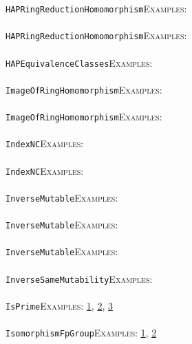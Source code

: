 \documentclass[a4paper,11pt]{report}
\begin{document}
{{ \texttt{HAPRingReductionHomomorphism}{\nobreakspace}{\nobreakspace}{\nobreakspace}{\nobreakspace}\textsc{Examples:} \\
 \\
 \texttt{HAPRingReductionHomomorphism}{\nobreakspace}{\nobreakspace}{\nobreakspace}{\nobreakspace}\textsc{Examples:} \\
 \\
 \texttt{HAP{\textunderscore}EquivalenceClasses}{\nobreakspace}{\nobreakspace}{\nobreakspace}{\nobreakspace}\textsc{Examples:} \\
 \\
 \texttt{ImageOfRingHomomorphism}{\nobreakspace}{\nobreakspace}{\nobreakspace}{\nobreakspace}\textsc{Examples:} \\
 \\
 \texttt{ImageOfRingHomomorphism}{\nobreakspace}{\nobreakspace}{\nobreakspace}{\nobreakspace}\textsc{Examples:} \\
 \\
 \texttt{IndexNC}{\nobreakspace}{\nobreakspace}{\nobreakspace}{\nobreakspace}\textsc{Examples:} \\
 \\
 \texttt{IndexNC}{\nobreakspace}{\nobreakspace}{\nobreakspace}{\nobreakspace}\textsc{Examples:} \\
 \\
 \texttt{InverseMutable}{\nobreakspace}{\nobreakspace}{\nobreakspace}{\nobreakspace}\textsc{Examples:} \\
 \\
 \texttt{InverseMutable}{\nobreakspace}{\nobreakspace}{\nobreakspace}{\nobreakspace}\textsc{Examples:} \\
 \\
 \texttt{InverseMutable}{\nobreakspace}{\nobreakspace}{\nobreakspace}{\nobreakspace}\textsc{Examples:} \\
 \\
 \texttt{InverseSameMutability}{\nobreakspace}{\nobreakspace}{\nobreakspace}{\nobreakspace}\textsc{Examples:} \\
 \\
 \texttt{IsPrime}{\nobreakspace}{\nobreakspace}{\nobreakspace}{\nobreakspace}\textsc{Examples:} \href{tutorial/chap10.html} {1}{\nobreakspace}, \href{../www/SideLinks/About/aboutSchurMultiplier.html} {2}{\nobreakspace}, \href{../www/SideLinks/About/aboutTensorSquare.html} {3}{\nobreakspace} \\
 \\
 \texttt{IsomorphismFpGroup}{\nobreakspace}{\nobreakspace}{\nobreakspace}{\nobreakspace}\textsc{Examples:} \href{../www/SideLinks/About/aboutArithmetic.html} {1}{\nobreakspace}, \href{../www/SideLinks/About/aboutRosenbergerMonster.html} {2}{\nobreakspace} \\
}}
\end{document}
